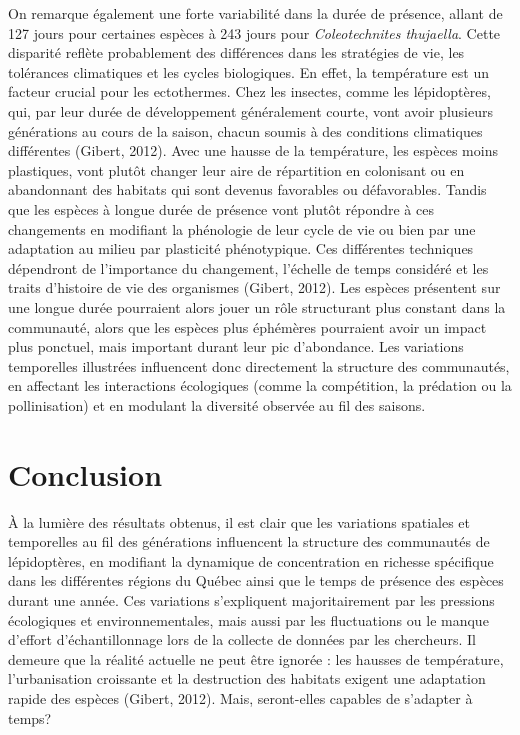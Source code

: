 \documentclass[9pt,twocolumn,twoside,]{pnas-new}
\begin{document}
On remarque également une forte variabilité dans la durée de présence,
allant de 127 jours pour certaines espèces à 243 jours pour
\emph{Coleotechnites thujaella}. Cette disparité reflète probablement
des différences dans les stratégies de vie, les tolérances climatiques
et les cycles biologiques. En effet, la température est un facteur
crucial pour les ectothermes. Chez les insectes, comme les lépidoptères,
qui, par leur durée de développement généralement courte, vont avoir
plusieurs générations au cours de la saison, chacun soumis à des
conditions climatiques différentes (Gibert, 2012). Avec une hausse de la
température, les espèces moins plastiques, vont plutôt changer leur aire
de répartition en colonisant ou en abandonnant des habitats qui sont
devenus favorables ou défavorables. Tandis que les espèces à longue
durée de présence vont plutôt répondre à ces changements en modifiant la
phénologie de leur cycle de vie ou bien par une adaptation au milieu par
plasticité phénotypique. Ces différentes techniques dépendront de
l'importance du changement, l'échelle de temps considéré et les traits
d'histoire de vie des organismes (Gibert, 2012). Les espèces présentent
sur une longue durée pourraient alors jouer un rôle structurant plus
constant dans la communauté, alors que les espèces plus éphémères
pourraient avoir un impact plus ponctuel, mais important durant leur pic
d'abondance. Les variations temporelles illustrées influencent donc
directement la structure des communautés, en affectant les interactions
écologiques (comme la compétition, la prédation ou la pollinisation) et
en modulant la diversité observée au fil des saisons.

\section*{Conclusion}\label{conclusion}

À la lumière des résultats obtenus, il est clair que les variations
spatiales et temporelles au fil des générations influencent la structure
des communautés de lépidoptères, en modifiant la dynamique de
concentration en richesse spécifique dans les différentes régions du
Québec ainsi que le temps de présence des espèces durant une année. Ces
variations s'expliquent majoritairement par les pressions écologiques et
environnementales, mais aussi par les fluctuations ou le manque d'effort
d'échantillonnage lors de la collecte de données par les chercheurs. Il
demeure que la réalité actuelle ne peut être ignorée : les hausses de
température, l'urbanisation croissante et la destruction des habitats
exigent une adaptation rapide des espèces (Gibert, 2012). Mais,
seront-elles capables de s'adapter à temps?
\end{document}
